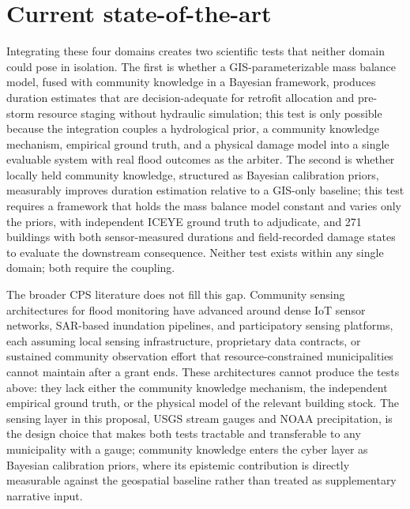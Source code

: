 \documentclass[11pt]{article}
\begin{document}

\vspace{-5pt}
\section{Current state-of-the-art}

Integrating these four domains creates two scientific tests that neither domain
could pose in isolation.
The first is whether a GIS-parameterizable mass balance model, fused with community
knowledge in a Bayesian framework, produces duration estimates that are
decision-adequate for retrofit allocation and pre-storm resource staging without
hydraulic simulation; this test is only possible because the integration couples a
hydrological prior, a community knowledge mechanism, empirical ground truth, and a
physical damage model into a single evaluable system with real flood outcomes as the
arbiter.
The second is whether locally held community knowledge, structured as Bayesian
calibration priors, measurably improves duration estimation relative to a GIS-only
baseline; this test requires a framework that holds the mass balance model constant
and varies only the priors, with independent ICEYE ground truth to adjudicate, and
271 buildings with both sensor-measured durations and field-recorded damage states
to evaluate the downstream consequence.
Neither test exists within any single domain; both require the coupling.

The broader CPS literature does not fill this gap.
Community sensing architectures for flood monitoring have advanced around dense IoT
sensor networks, SAR-based inundation pipelines, and participatory sensing platforms,
each assuming local sensing infrastructure, proprietary data contracts, or sustained
community observation effort that resource-constrained municipalities cannot maintain
after a grant ends.
These architectures cannot produce the tests above: they lack either the community
knowledge mechanism, the independent empirical ground truth, or the physical model
of the relevant building stock.
The sensing layer in this proposal, USGS stream gauges and NOAA precipitation, is the
design choice that makes both tests tractable and transferable to any municipality with
a gauge; community knowledge enters the cyber layer as Bayesian calibration priors,
where its epistemic contribution is directly measurable against the geospatial baseline
rather than treated as supplementary narrative input.
\end{document}
